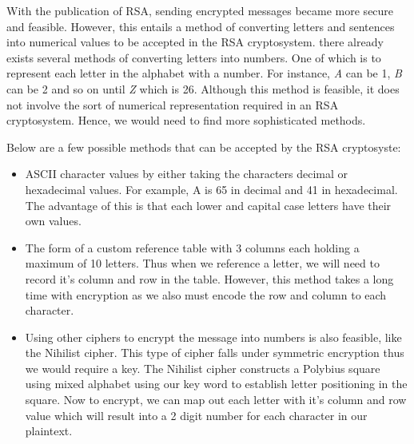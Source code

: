 \documentclass{article}
\begin{document}
\quad \quad With the publication of RSA, sending encrypted messages became more secure and feasible. However, this entails a method of converting letters and sentences into numerical values to be accepted in the RSA cryptosystem. there already exists several methods of converting letters into numbers. One of which is to represent each letter in the alphabet with a number. For instance, \textit{A} can be 1, \textit{B} can be 2 and so on until \textit{Z} which is 26. Although this method is feasible, it does not involve the sort of numerical representation required in an RSA cryptosystem. Hence, we would need to find more sophisticated methods.

Below are a few possible methods that can be accepted by the RSA cryptosyste:
\begin{itemize}
    \item ASCII character values by either taking the characters decimal or hexadecimal values. For example, A is 65 in decimal and 41 in hexadecimal. The advantage of this is that each lower and capital case letters have their own values.
    \item The form of a custom reference table with 3 columns each holding a maximum of 10 letters. Thus when we reference a letter, we will need to record it's column and row in the table. However, this method takes a long time with encryption as we also must encode the row and column to each character.
    \item Using other ciphers to encrypt the message into numbers is also feasible, like the Nihilist cipher. This type of cipher falls under symmetric encryption thus we would require a key. The Nihilist cipher constructs a Polybius square using mixed alphabet using our key word to establish letter positioning in the square. Now to encrypt, we can map out each letter with it's column and row value which will result into a 2 digit number for each character in our plaintext. 
\end{itemize}
\end{document}
